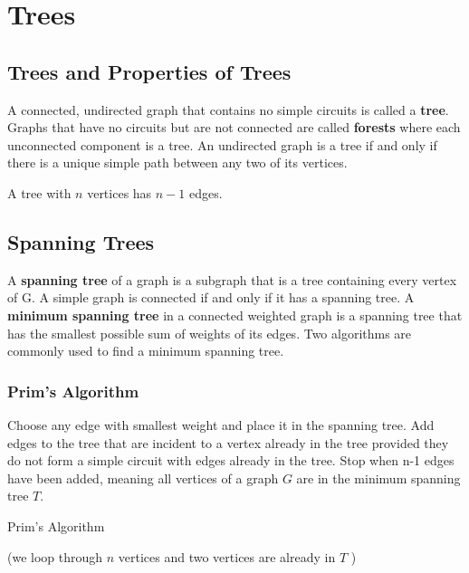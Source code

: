 \begin{itemize}
\begin{algorithm}[H]
\begin{algorithmic}
		\EndFunction{}
	\end{algorithmic}
\end{algorithm}

\end{itemize}

\section{Trees}
\subsection{Trees and Properties of Trees}
A connected, undirected graph that contains no simple circuits is called a \textbf{tree}.
Graphs that have no circuits but are not connected are called \textbf{forests} where each unconnected component is a tree.
An undirected graph is a tree if and only if there is a unique simple path between any two of its vertices.



A tree with \( n \) vertices has \( n-1 \) edges.

\subsection{Spanning Trees}
A \textbf{spanning tree} of a graph is a subgraph that is a tree containing every vertex of G. A simple graph is connected if and only if it has a spanning tree.
A \textbf{minimum spanning tree} in a connected weighted graph is a spanning tree that has the smallest possible sum of weights of its edges. Two algorithms are commonly used to find a minimum spanning tree.

\subsubsection{Prim's Algorithm}
Choose any edge with smallest weight and place it in the spanning tree. Add edges to the tree that are incident to a vertex already in the tree provided they do not form a simple circuit with edges already in the tree. Stop when n-1 edges have been added, meaning all vertices of a graph \( G \) are in the minimum spanning tree \( T \).

\begin{algorithm}[H]
	\caption{Prim's Algorithm}\label{alg:prim}
	\begin{algorithmic}
		 (we loop through \( n \)  vertices and two vertices are already in \( T \) )
		\EndFor{}
		\EndFunction{}
	\end{algorithmic}
\end{algorithm}



